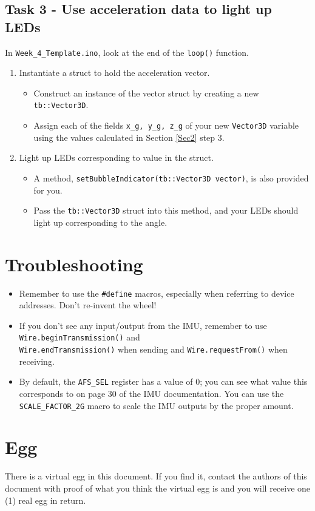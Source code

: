 \documentclass{article}
\begin{document}
    \subsection{Task 3 - Use acceleration data to light up LEDs}
    
        In \texttt{Week\_4\_Template.ino}, look at the end of the \texttt{loop()} function.
    
        \begin{enumerate}
            \item Instantiate a struct to hold the acceleration vector.
            \begin{itemize}
                \item Construct an instance of the vector struct by creating a new \texttt{tb::Vector3D}. 
                \item Assign each of the fields \texttt{x\_g, y\_g, z\_g}  of your new \texttt{Vector3D} variable using the values calculated in Section \ref{Sec2} step 3. 
            \end{itemize}
            \item Light up LEDs corresponding to value in the struct.
            \begin{itemize}
                \item A method, \texttt{setBubbleIndicator(tb::Vector3D vector)}, is also provided for you.
                \item Pass the \texttt{tb::Vector3D} struct into this method, and your LEDs should light up corresponding to the angle. 
            \end{itemize}
        \end{enumerate}
    

\section{Troubleshooting}
    \begin{itemize}
        \item Remember to use the \texttt{\#define} macros, especially when referring to device addresses. Don't re-invent the wheel!
        \item If you don't see any input/output from the IMU, remember to use \texttt{Wire.beginTransmission()} and \\ \texttt{Wire.endTransmission()} when sending and \texttt{Wire.requestFrom()} when receiving.
        \item By default, the \texttt{AFS\_SEL} register has a value of 0; you can see what value this corresponds to on page 30 of the IMU documentation. You can use the \texttt{SCALE\_FACTOR\_2G} macro to scale the IMU outputs by the proper amount.
        
    \end{itemize}
    
    \section{Egg}
    There is a virtual egg in this document. If you find it, contact the authors of this document with proof of what you think the virtual egg is and you will receive one (1) real egg in return. 
\end{document}
